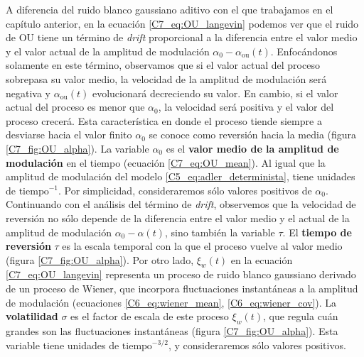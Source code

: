 \documentclass[./main.tex]{subfiles}
\begin{document}
A diferencia del ruido blanco gaussiano aditivo con el que trabajamos en el capítulo anterior, en la ecuación \ref{C7_eq:OU_langevin} podemos ver que el ruido de OU tiene un término de \textit{drift} proporcional a la diferencia entre el valor medio y el valor actual de la amplitud de modulación $\alpha_0 - \alpha_{\text{ou}}(t)$. Enfocándonos solamente en este término, observamos que si el valor actual del proceso sobrepasa su valor medio, la velocidad de la amplitud de modulación será negativa y $\alpha_{\text{ou}}(t)$ evolucionará decreciendo su valor. En cambio, si el valor actual del proceso es menor que $\alpha_0$, la velocidad será positiva y el valor del proceso crecerá. Esta característica en donde el proceso tiende siempre a desviarse hacia el valor finito $\alpha_0$ se conoce como reversión hacia la media (figura \ref{C7_fig:OU_alpha}).  La variable $\alpha_0$ es el \textbf{valor medio de la amplitud de modulación} en el tiempo (ecuación \ref{C7_eq:OU_mean}). Al igual que la amplitud de modulación del modelo \ref{C5_eq:adler_determinista}, tiene unidades de $\text{tiempo}^{-1}$. Por simplicidad, consideraremos sólo valores positivos de $\alpha_0$. Continuando con el análisis del término de \textit{drift}, observemos que la velocidad de reversión no sólo depende de la diferencia entre el valor medio y el actual de la amplitud de modulación $\alpha_0 - \alpha(t)$, sino también la variable $\tau$. El \textbf{tiempo de reversión} $\tau$ es la escala temporal con la que el proceso vuelve al valor medio (figura \ref{C7_fig:OU_alpha}). Por otro lado, $\xi_w(t)$ en la ecuación \ref{C7_eq:OU_langevin} representa un proceso de ruido blanco gaussiano derivado de un proceso de Wiener, que incorpora fluctuaciones instantáneas a la amplitud de modulación (ecuaciones \ref{C6_eq:wiener_mean}, \ref{C6_eq:wiener_cov}). La \textbf{volatilidad} $\sigma$ es el factor de escala de este proceso $\xi_w(t)$, que regula cuán grandes son las fluctuaciones instantáneas  (figura \ref{C7_fig:OU_alpha}). Esta variable tiene unidades de $\text{tiempo}^{-3/2}$, y consideraremos sólo valores positivos. 
\end{document}
